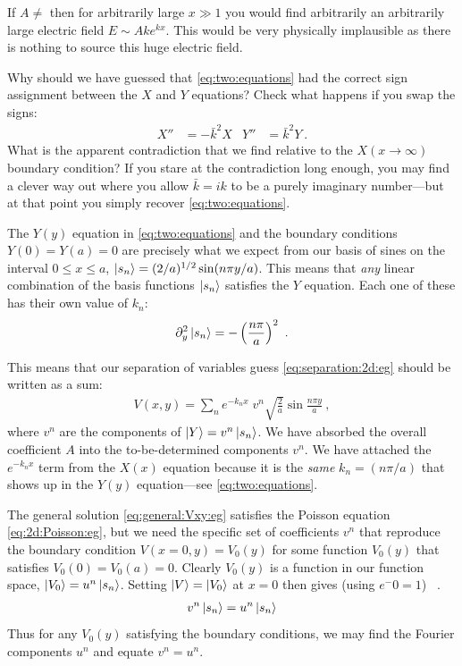 \documentclass[12pt, oneside]{report}    %
\begin{document}
\begin{example}
If $A\neq$ then for arbitrarily large $x\gg 1$ you would find arbitrarily an arbitrarily large electric field $E\sim Ake^{kx}$. This would be very physically implausible as there is nothing to  source this huge electric field.
\end{example}

\begin{exercise}\label{ex:two:equations:wrong:choice}
Why should we have guessed that \eqref{eq:two:equations} had the correct sign assignment between the $X$ and $Y$ equations? Check what happens if you swap the signs:
\begin{align}
    X'' &= -\bar k^2X 
    & Y''&= \bar k^2 Y \ .
    \label{eq:two:equations:wrong}
\end{align}
What is the apparent contradiction that we find relative to the $X(x\to\infty)$ boundary condition? If you stare at the contradiction long enough, you may find a clever way out where you allow $\bar k=ik$ to be a purely imaginary number---but at that point you simply recover \eqref{eq:two:equations}. 
\end{exercise}

The $Y(y)$ equation in \eqref{eq:two:equations} and the boundary conditions $Y(0)= Y(a) = 0$ are precisely what we expect from our basis of sines on the interval $0 \leq x \leq a$, $\left|s_n\right\rangle = (2/a)^{1/2}\sin (n\pi y/a)$. This means that \emph{any} linear combination of the basis functions $\left|s_n\right\rangle$ satisfies the $Y$ equation. Each one of these has their own value of $k_n$:
\begin{align}
    \partial_y^2 \left|s_n\right\rangle = -\left(\frac{n\pi}{a}\right)^2 \ .
\end{align}

This means that our separation of variables guess \eqref{eq:separation:2d:eg} should be written as a sum:
\begin{align}
    V(x,y) = \sum_n e^{-k_n x} \; v^n \sqrt{\frac{2}{a}} \sin \frac{n\pi y}{a} \ ,
    \label{eq:general:Vxy:eg}
\end{align}
where $v^n$ are the components of $\left|Y\right\rangle = v^n\left|s_n\right\rangle$. We have absorbed the overall coefficient $A$ into the to-be-determined components $v^n$. We have attached the $e^{-k_nx}$ term from the $X(x)$ equation because it is the \emph{same} $k_n = (n\pi/a)$ that shows up in the $Y(y)$ equation---see \eqref{eq:two:equations}.

The general solution \eqref{eq:general:Vxy:eg} satisfies the Poisson equation \eqref{eq:2d:Poisson:eg}, but we need the specific set of coefficients $v^n$ that reproduce the boundary condition $V(x=0,y) = V_0(y)$ for some function $V_0(y)$ that satisfies $V_0(0) = V_0(a) = 0$. Clearly $V_0(y)$ is a function in our function space, $\left|V_0\right\rangle = u^n \left|s_n\right\rangle$. Setting $\left|V\right\rangle = \left|V_0\right\rangle$ at $x=0$ then gives (using $e^-0 = 1$) \ .
\begin{align}
    v^n \left|s_n\right\rangle = u^n \left|s_n\right\rangle
\end{align}
Thus for any $V_0(y)$ satisfying the boundary conditions, we may find the Fourier components $u^n$ and equate $v^n = u^n$.
\end{document}
